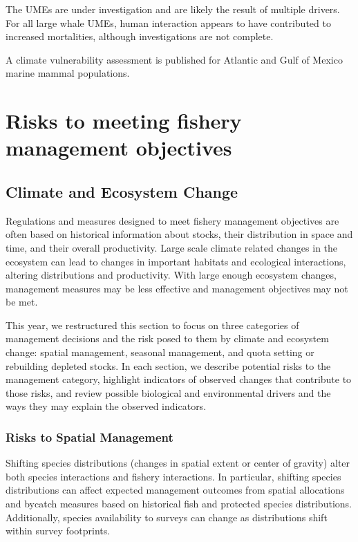 \documentclass[
  10pt,
]{article}
\begin{document}
The UMEs are under investigation and are likely the result of multiple drivers. For all large whale UMEs, human interaction appears to have contributed to increased mortalities, although investigations are not complete.

A climate vulnerability assessment is published for Atlantic and Gulf of Mexico marine mammal populations.

\newpage

\hypertarget{risks-to-meeting-fishery-management-objectives}{%
\section{Risks to meeting fishery management objectives}\label{risks-to-meeting-fishery-management-objectives}}

\hypertarget{climate-and-ecosystem-change}{%
\subsection{Climate and Ecosystem Change}\label{climate-and-ecosystem-change}}

Regulations and measures designed to meet fishery management objectives are often based on historical information about stocks, their distribution in space and time, and their overall productivity. Large scale climate related changes in the ecosystem can lead to changes in important habitats and ecological interactions, altering distributions and productivity. With large enough ecosystem changes, management measures may be less effective and management objectives may not be met.

This year, we restructured this section to focus on three categories of management decisions and the risk posed to them by climate and ecosystem change: spatial management, seasonal management, and quota setting or rebuilding depleted stocks. In each section, we describe potential risks to the management category, highlight indicators of observed changes that contribute to those risks, and review possible biological and environmental drivers and the ways they may explain the observed indicators.

\hypertarget{risks-to-spatial-management}{%
\subsubsection{Risks to Spatial Management}\label{risks-to-spatial-management}}

Shifting species distributions (changes in spatial extent or center of gravity) alter both species interactions and fishery interactions. In particular, shifting species distributions can affect expected management outcomes from spatial allocations and bycatch measures based on historical fish and protected species distributions. Additionally, species availability to surveys can change as distributions shift within survey footprints.
\end{document}
